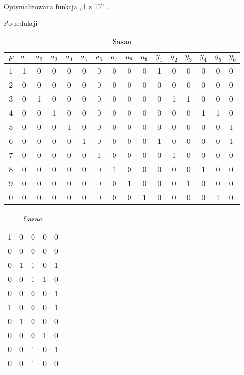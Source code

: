 \begin{table}[H]
\caption{Optymalizowana funkcja ,,1 z 10'' \cite{sasao-s-min}.}
\begin{subtable}{.64\linewidth}
\caption{Po redukcji}
\label{1of10-reduct}

\begin{tabular}{|r|c@{}c@{}c@{}c@{}c@{}c@{}c@{}c@{}c|c@{}c@{}c@{}c@{}c@{}l|}
\hline
$F$ & $a_1$ & $a_2$ & $a_3$ & $a_4$ & $a_5$ & $a_6$ & $a_7$ & $a_8$ & $a_9$ & $y_1$ & $y_2$ & $y_3$ & $y_4$ & $y_5$ & $y_6$ \\
\hline
1 & 1 & 0 & 0 & 0 & 0 & 0 & 0 & 0 & 0 & 1 & 0 & 0 & 0 & 0 & 0 \\
2 & 0 & 0 & 0 & 0 & 0 & 0 & 0 & 0 & 0 & 0 & 0 & 0 & 0 & 0 & 0 \\
3 & 0 & 1 & 0 & 0 & 0 & 0 & 0 & 0 & 0 & 0 & 1 & 1 & 0 & 0 & 0 \\
4 & 0 & 0 & 1 & 0 & 0 & 0 & 0 & 0 & 0 & 0 & 0 & 0 & 1 & 1 & 0 \\
5 & 0 & 0 & 0 & 1 & 0 & 0 & 0 & 0 & 0 & 0 & 0 & 0 & 0 & 0 & 1 \\
6 & 0 & 0 & 0 & 0 & 1 & 0 & 0 & 0 & 0 & 1 & 0 & 0 & 0 & 0 & 1 \\
7 & 0 & 0 & 0 & 0 & 0 & 1 & 0 & 0 & 0 & 0 & 1 & 0 & 0 & 0 & 0 \\
8 & 0 & 0 & 0 & 0 & 0 & 0 & 1 & 0 & 0 & 0 & 0 & 0 & 1 & 0 & 0 \\
9 & 0 & 0 & 0 & 0 & 0 & 0 & 0 & 1 & 0 & 0 & 0 & 1 & 0 & 0 & 0 \\
0 & 0 & 0 & 0 & 0 & 0 & 0 & 0 & 0 & 1 & 0 & 0 & 0 & 0 & 1 & 0 \\
\hline
\end{tabular}

\end{subtable}
\begin{subtable}{.12\linewidth}
\caption{Sasao}
\label{1of10-reduct-b}

\begin{tabular}{|r@{}c@{}c@{}c@{}l|}
\hline
  &   &   &   &   \\
\hline
1 & 0 & 0 & 0 & 0 \\
0 & 0 & 0 & 0 & 0 \\
0 & 1 & 1 & 0 & 1 \\
0 & 0 & 1 & 1 & 0 \\
0 & 0 & 0 & 0 & 1 \\
1 & 0 & 0 & 0 & 1 \\
0 & 1 & 0 & 0 & 0 \\
0 & 0 & 0 & 1 & 0 \\
0 & 0 & 1 & 0 & 1 \\
0 & 0 & 1 & 0 & 0 \\
\hline
\end{tabular}


\end{subtable}
\end{table}
